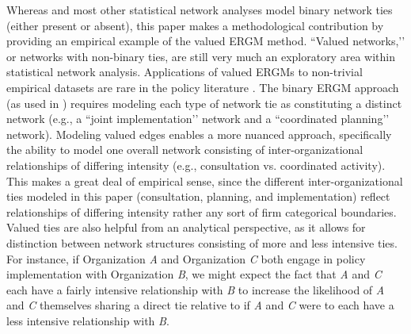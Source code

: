 \documentclass[12pt,a4paper,titlepage]{article}
\begin{document}
Whereas \textcite{scott2015} and most other statistical network analyses model binary network ties (either present or absent), this paper makes a methodological contribution by providing an empirical example of the valued ERGM method. ``Valued networks,’’ or networks with non-binary ties, are still very much an exploratory area within statistical network analysis. Applications of valued ERGMs to non-trivial empirical datasets are rare in the policy literature \parencite{desmarais2012-a, krivitsky2012}. The binary ERGM approach (as used in \textcite{scott2015}) requires modeling each type of network tie as constituting a distinct network (e.g., a ``joint implementation’’ network and a ``coordinated planning’’ network). Modeling valued edges enables a more nuanced approach, specifically the ability to model one overall network consisting of inter-organizational relationships of differing intensity (e.g., consultation vs. coordinated activity). This makes a great deal of empirical sense, since the different inter-organizational ties modeled in this paper (consultation, planning, and implementation) reflect relationships of differing intensity rather any sort of firm categorical boundaries. Valued ties are also helpful from an analytical perspective, as it allows for distinction between network structures consisting of more and less intensive ties. For instance, if Organization \textit{A} and Organization \textit{C} both engage in policy implementation with Organization \textit{B}, we might expect the fact that \textit{A} and \textit{C} each have a fairly intensive relationship with \textit{B} to increase the likelihood of \textit{A} and \textit{C} themselves sharing a direct tie relative to if \textit{A} and \textit{C} were to each have a less intensive relationship with \textit{B}.
\end{document}

